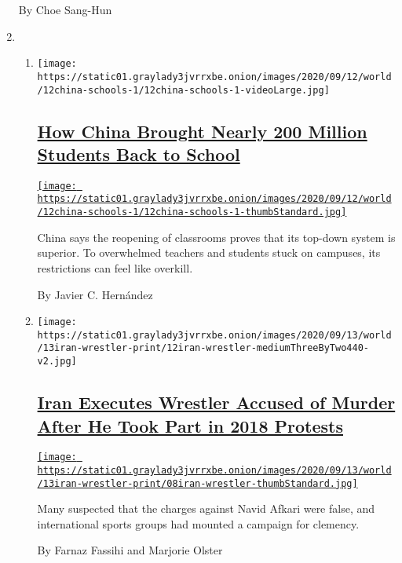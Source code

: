 \begin{enumerate}
  By Choe Sang-Hun
\item
  \begin{enumerate}
  \def\labelenumii{\arabic{enumii}.}
  \item
    \texttt{[image: https://static01.graylady3jvrrxbe.onion/images/2020/09/12/world/12china-schools-1/12china-schools-1-videoLarge.jpg]}

    \hypertarget{how-china-brought-nearly-200-million-students-back-to-school}{%
    \subsection{\texorpdfstring{\href{/2020/09/12/world/asia/china-schools-reopening.html}{How
    China Brought Nearly 200 Million Students Back to
    School}}{How China Brought Nearly 200 Million Students Back to School}}\label{how-china-brought-nearly-200-million-students-back-to-school}}

    \href{/2020/09/12/world/asia/china-schools-reopening.html}{\texttt{[image: https://static01.graylady3jvrrxbe.onion/images/2020/09/12/world/12china-schools-1/12china-schools-1-thumbStandard.jpg]}}

    China says the reopening of classrooms proves that its top-down
    system is superior. To overwhelmed teachers and students stuck on
    campuses, its restrictions can feel like overkill.

    By Javier C. Hernández
  \item
    \texttt{[image: https://static01.graylady3jvrrxbe.onion/images/2020/09/13/world/13iran-wrestler-print/12iran-wrestler-mediumThreeByTwo440-v2.jpg]}

    \hypertarget{iran-executes-wrestler-accused-of-murder-after-he-took-part-in-2018-protests}{%
    \subsection{\texorpdfstring{\href{/2020/09/12/world/middleeast/iran-wrestler-navid-afkari.html}{Iran
    Executes Wrestler Accused of Murder After He Took Part in 2018
    Protests}}{Iran Executes Wrestler Accused of Murder After He Took Part in 2018 Protests}}\label{iran-executes-wrestler-accused-of-murder-after-he-took-part-in-2018-protests}}

    \href{/2020/09/12/world/middleeast/iran-wrestler-navid-afkari.html}{\texttt{[image: https://static01.graylady3jvrrxbe.onion/images/2020/09/13/world/13iran-wrestler-print/08iran-wrestler-thumbStandard.jpg]}}

    Many suspected that the charges against Navid Afkari were false, and
    international sports groups had mounted a campaign for clemency.

    By Farnaz Fassihi and Marjorie Olster
  \end{enumerate}
\end{enumerate}

